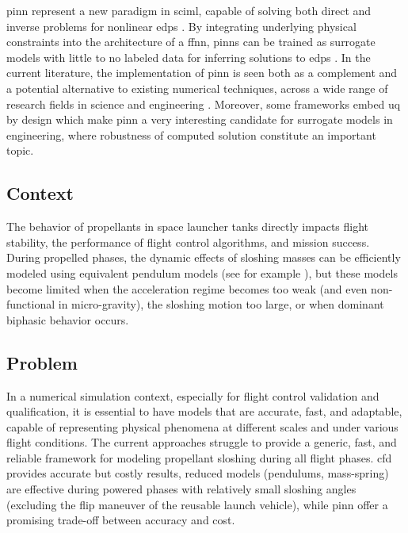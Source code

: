 \documentclass[12pt]{article}
\begin{document}
	\gls{pinn} represent a new paradigm in \gls{sciml}, capable of solving both direct and inverse problems for nonlinear \gls{edps} \cite{raissiPhysicsinformedNeuralNetworks2019}. By integrating underlying physical constraints into the architecture of a \gls{ffnn}, \gls{pinn}s can be trained as surrogate models with little to no labeled data for inferring solutions to \gls{edps} \cite{cuomoScientificMachineLearning2022}.
	In the current literature, the implementation of \gls{pinn} is seen both as a complement and a potential alternative to existing numerical techniques, across a wide range of research fields in science and engineering \cite{maoPhysicsinformedNeuralNetworks2020, buosoPersonalisingLeftventricularBiophysical2021, caiPhysicsInformedNeuralNetworks2021}.
	Moreover, some frameworks embed \gls{uq} by design \cite{yangBPINNsBayesianPhysicsInformed2021,zhangQuantifyingTotalUncertainty2018} which make \gls{pinn} a very interesting candidate for surrogate models in engineering, where robustness of computed solution constitute an important topic.
	
	\subsection*{Context}
	
	The behavior of propellants in space launcher tanks directly impacts flight stability, the performance of flight control algorithms, and mission success. During propelled phases, the dynamic effects of sloshing masses can be efficiently modeled using equivalent pendulum models (see for example \cite{ibrahimLiquidSloshingDynamics2005a}), but these models become limited when the acceleration regime becomes too weak (and even non-functional in micro-gravity), the sloshing motion too large, or when dominant biphasic behavior occurs.
	
	\subsection*{Problem}
	
	In a numerical simulation context, especially for flight control validation and qualification, it is essential to have models that are accurate, fast, and adaptable, capable of representing physical phenomena at different scales and under various flight conditions.
	The current approaches struggle to provide a generic, fast, and reliable framework for modeling propellant sloshing during all flight phases. \acrshort{cfd} provides accurate but costly results, reduced models (pendulums, mass-spring) are effective during powered phases with relatively small sloshing angles (excluding the flip maneuver of the reusable launch vehicle), while \gls{pinn} offer a promising trade-off between accuracy and cost.
	
\end{document}
